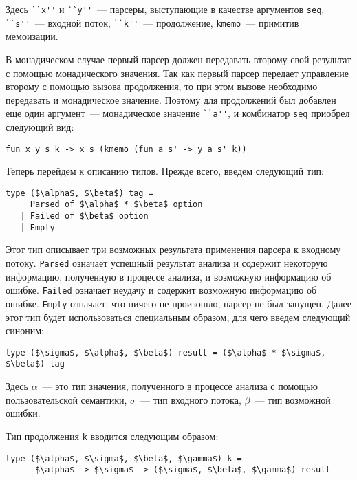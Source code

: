 \documentclass[conference]{IEEEtran}
\begin{document}
Здесь \lstinline|``x''| и \lstinline|``y''|~--- парсеры, выступающие в качестве аргументов \lstinline|seq|, \lstinline|``s''|~--- входной поток, \lstinline|``k''|~--- продолжение,
\lstinline|kmemo|~--- примитив мемоизации.

В монадическом случае первый парсер должен передавать второму свой результат с помощью монадического значения. Так как первый парсер передает управление второму с
помощью вызова продолжения, то при этом вызове необходимо передавать и монадическое значение. Поэтому для продолжений был добавлен еще один аргумент~--- монадическое
значение \lstinline|``a''|, и комбинатор \lstinline|seq| приобрел следующий вид:

\begin{lstlisting}[basicstyle=\small]
   fun x y s k -> x s (kmemo (fun a s' -> y a s' k))
\end{lstlisting}

Теперь перейдем к описанию типов. Прежде всего, введем следующий тип:

\begin{lstlisting}[basicstyle=\small]
   type ($\alpha$, $\beta$) tag =
     Parsed of $\alpha$ * $\beta$ option
   | Failed of $\beta$ option
   | Empty
\end{lstlisting}

Этот тип описывает три возможных результата применения парсера к входному потоку. \lstinline|Parsed| означает успешный результат анализа и содержит некоторую информацию, полученную в процессе
анализа, и возможную информацию об ошибке. \lstinline|Failed| означает неудачу и содержит возможную информацию об ошибке. \lstinline|Empty| означает, что ничего не произошло, парсер не был запущен.
Далее этот тип будет использоваться специальным образом, для чего введем следующий синоним:

\begin{lstlisting}[basicstyle=\small]
   type ($\sigma$, $\alpha$, $\beta$) result = ($\alpha$ * $\sigma$, $\beta$) tag
\end{lstlisting}

Здесь $\alpha$~--- это тип значения, полученного в процессе анализа с помощью пользовательской семантики, $\sigma$~--- тип входного потока, $\beta$~--- тип возможной ошибки.

Тип продолжения \lstinline|k| вводится следующим образом:

\begin{lstlisting}[basicstyle=\small]
   type ($\alpha$, $\sigma$, $\beta$, $\gamma$) k =
      $\alpha$ -> $\sigma$ -> ($\sigma$, $\beta$, $\gamma$) result
\end{lstlisting}
\end{document}
